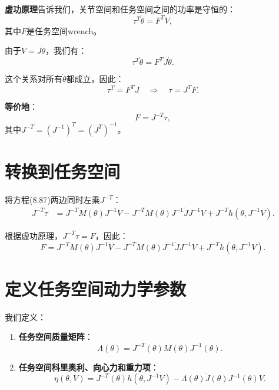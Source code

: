 \documentclass{article}
\begin{document}
\textbf{虚功原理}告诉我们，关节空间和任务空间之间的功率是守恒的：
\begin{equation}
\tau^T\dot{\theta} = F^T V,
\end{equation}
其中$F$是任务空间wrench。

由于$V = J\dot{\theta}$，我们有：
\begin{equation}
\tau^T\dot{\theta} = F^T J\dot{\theta}.
\end{equation}

这个关系对所有$\dot{\theta}$都成立，因此：
\begin{equation}
\tau^T = F^T J \quad \Rightarrow \quad \tau = J^T F.
\end{equation}

\textbf{等价地}：
\begin{equation}
F = J^{-T}\tau, \tag{8.51}
\end{equation}
其中$J^{-T} = (J^{-1})^T = (J^T)^{-1}$。

\section{转换到任务空间}

将方程(8.87)两边同时左乘$J^{-T}$：
\begin{align}
J^{-T}\tau &= J^{-T}M(\theta)J^{-1}\dot{V} - J^{-T}M(\theta)J^{-1}\dot{J}J^{-1}V + J^{-T}h(\theta, J^{-1}V). \tag{8.88}
\end{align}

根据虚功原理，$J^{-T}\tau = F$，因此：
\begin{equation}
F = J^{-T}M(\theta)J^{-1}\dot{V} - J^{-T}M(\theta)J^{-1}\dot{J}J^{-1}V + J^{-T}h(\theta, J^{-1}V). \tag{8.89}
\end{equation}

\section{定义任务空间动力学参数}

我们定义：

\begin{enumerate}
\item \textbf{任务空间质量矩阵}：
\begin{equation}
\Lambda(\theta) = J^{-T}(\theta)M(\theta)J^{-1}(\theta). \tag{8.90}
\end{equation}

\item \textbf{任务空间科里奥利、向心力和重力项}：
\begin{equation}
\eta(\theta, V) = J^{-T}(\theta)h(\theta, J^{-1}V) - \Lambda(\theta)\dot{J}(\theta)J^{-1}(\theta)V. \tag{8.91}
\end{equation}
\end{enumerate}
\end{document}
